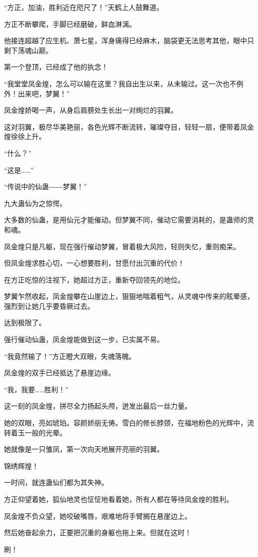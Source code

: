 \begin{this_body}
“方正，加油，胜利近在咫尺了！”天鹤上人鼓舞道。

方正不断攀爬，手脚已经磨破，鲜血淋漓。

他接连超越了应生机、萧七星，浑身痛得已经麻木，脑袋更无法思考其他，眼中只剩下荡魂山巅。

第一个登顶，已经成了他的执念！

“我堂堂凤金煌，怎么可以输在这里？我自出生以来，从未输过。这一次也不例外！出来吧，梦翼！”

凤金煌娇喝一声，从身后肩膀处生长出一对绚烂的羽翼。

这对羽翼，极尽华美艳丽，各色光辉不断流转，璀璨夺目，轻轻一扇，便带着凤金煌徐徐上升。

“什么？”

“这是……”

“传说中的仙蛊――梦翼！”

九大蛊仙为之惊愕。

大多数的仙蛊，是用仙元才能催动。但梦翼不同，催动它需要消耗的，是蛊师的灵和魂。

凤金煌只是凡躯，现在强行催动梦翼，冒着极大风险，轻则失忆，重则痴呆。

但凤金煌求胜心切，一心想要胜利，甘愿付出沉重的代价！

在方正吃惊的注视下，她超过方正，重新夺回领先的地位。

梦翼乍然收起，凤金煌攀在山崖边上，狠狠地喘着粗气，从灵魂中传来的眩晕感，强烈到让她几乎要昏厥过去。

达到极限了。

强行催动仙蛊，凤金煌能做到这一步，已实属不易。

“我竟然输了！”方正瞪大双眼，失魂落魄。

凤金煌的双手已经抵达了悬崖边缘。

“我，我要……胜利！”

这一刻的凤金煌，拼尽全力扬起头颅，迸发出最后一丝力量。

她的双眼，亮如琥珀。容颜娇丽无俦。雪白的修长脖颈，在福地粉色的光辉中，流转着玉一般的光晕。

她就像是一只雏凤，第一次向天地展开亮丽的羽翼。

锦绣辉煌！

一时间，就连蛊仙们都为其失神。

方正仰望着她，狐仙地灵也怔怔地看着她，所有人都在等待凤金煌的胜利。

凤金煌不负众望，她咬破嘴唇，艰难地将手臂搁在悬崖边上。

然后她奋起余力，正要把沉重的身躯也拖上来。但就在这时！

刷！


\end{this_body}
